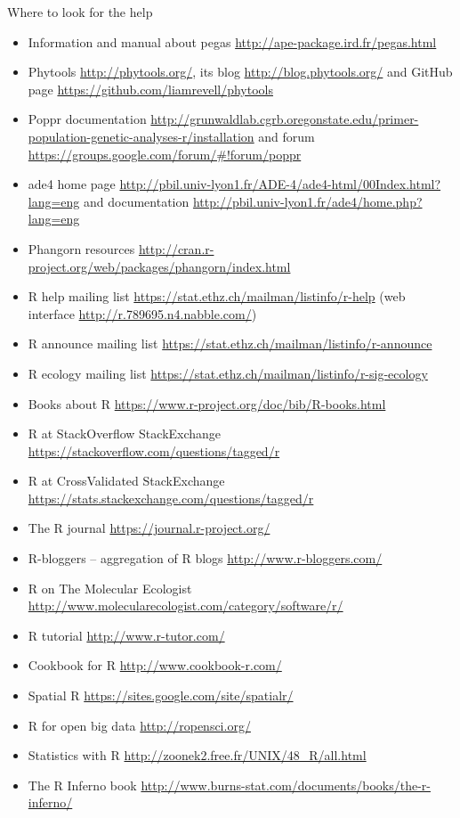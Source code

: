 \documentclass[compress, ucs, xelatex, 11pt, xcolor=svgnames,
  hyperref={
    bookmarks=true,
    unicode=true,
    colorlinks=true,
    pdftitle={Molecular data in R},
    plainpages=false,
    pdfauthor={Vojtech Zeisek},
    pdfsubject={Course about phylogeny and evolution in R},
    pdfcreator={XeLaTeX},
    pdfkeywords={R, evolution, phylogeny, molecular data},
    linkcolor=Tomato,
    anchorcolor=SaddleBrown,
    citecolor=Goldenrod,
    filecolor=DarkMagenta,
    menucolor=Sienna,
    urlcolor=DarkTurquoise,
    pdftex},
  url={hyphens, lowtilde} %
  ]{beamer}
\begin{document}
\begin{frame}[allowframebreaks]{Where to look for the help}
\begin{itemize}
    \item Information and manual about pegas \url{http://ape-package.ird.fr/pegas.html}
    \item Phytools \url{http://phytools.org/}, its blog \url{http://blog.phytools.org/} and GitHub page \url{https://github.com/liamrevell/phytools}
    \item Poppr documentation \url{http://grunwaldlab.cgrb.oregonstate.edu/primer-population-genetic-analyses-r/installation} and forum \url{https://groups.google.com/forum/\#!forum/poppr}
    \item ade4 home page \url{http://pbil.univ-lyon1.fr/ADE-4/ade4-html/00Index.html?lang=eng} and documentation \url{http://pbil.univ-lyon1.fr/ade4/home.php?lang=eng}
    \item Phangorn resources \url{http://cran.r-project.org/web/packages/phangorn/index.html}
    \item R help mailing list \url{https://stat.ethz.ch/mailman/listinfo/r-help} (web interface \url{http://r.789695.n4.nabble.com/})
    \item R announce mailing list \url{https://stat.ethz.ch/mailman/listinfo/r-announce}
    \item R ecology mailing list \url{https://stat.ethz.ch/mailman/listinfo/r-sig-ecology}
    \item Books about R \url{https://www.r-project.org/doc/bib/R-books.html}
    \item R at StackOverflow StackExchange \url{https://stackoverflow.com/questions/tagged/r}
    \item R at CrossValidated StackExchange \url{https://stats.stackexchange.com/questions/tagged/r}
    \item The R journal \url{https://journal.r-project.org/}
    \item R-bloggers -- aggregation of R blogs \url{http://www.r-bloggers.com/}
    \item R on The Molecular Ecologist \url{http://www.molecularecologist.com/category/software/r/}
    \item R tutorial \url{http://www.r-tutor.com/}
    \item Cookbook for R  \url{http://www.cookbook-r.com/}
    \item Spatial R \url{https://sites.google.com/site/spatialr/}
    \item R for open big data \url{http://ropensci.org/}
    \item Statistics with R \url{http://zoonek2.free.fr/UNIX/48_R/all.html}
    \item The R Inferno book \url{http://www.burns-stat.com/documents/books/the-r-inferno/}

\end{itemize}
\end{frame}
\end{document}
